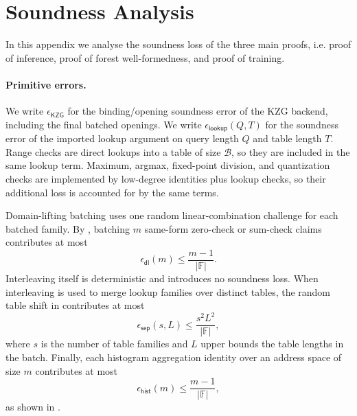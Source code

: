 \section{Soundness Analysis}\label{app:soundness}

In this appendix we analyse the soundness loss of the three
main proofs, i.e. proof of inference, proof of forest well-formedness, and proof of training. 

\paragraph{Primitive errors.}
We write $\epsilon_{\mathsf{KZG}}$ for the binding/opening soundness error of
the KZG backend, including the final batched openings.  We write
$\epsilon_{\mathsf{lookup}}(Q,T)$ for the soundness error of the imported lookup
argument on query length $Q$ and table length $T$.  Range checks are direct
lookups into a table of size $\mathcal{B}$, so they are included in the same
lookup term.  Maximum, argmax, fixed-point division, and quantization checks are
implemented by low-degree identities plus lookup checks, so their additional
loss is accounted for by the same terms.

Domain-lifting batching uses one random linear-combination challenge for each
batched family.  By , batching $m$ same-form
zero-check or sum-check claims contributes at most
\[
    \epsilon_{\mathsf{dl}}(m) \leq \frac{m-1}{|\mathbb{F}|}.
\]
Interleaving itself is deterministic and introduces no soundness loss.  When
interleaving is used to merge lookup families over distinct tables, the random
table shift in  contributes at most
\[
    \epsilon_{\mathsf{sep}}(s,L)
    \leq
    \frac{s^2L^2}{|\mathbb{F}|},
\]
where $s$ is the number of table families and $L$ upper bounds the table
lengths in the batch.  Finally, each histogram aggregation identity over an
address space of size $m$ contributes at most
\[
    \epsilon_{\mathsf{hist}}(m) \leq \frac{m-1}{|\mathbb{F}|},
\]
as shown in .

